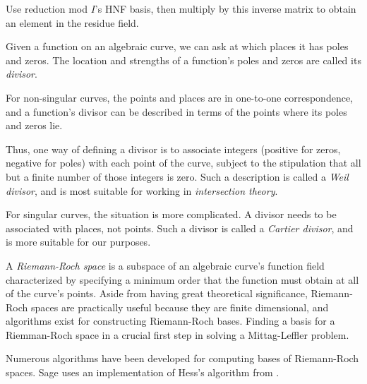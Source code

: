Use reduction mod $I$'s HNF basis, then multiply by this inverse matrix to obtain an element in the residue field.



\vfill\eject
{}

Given a function on an algebraic curve, we can ask at which places it
has poles and zeros.  The location and strengths of a function's
poles and zeros are called its {\it divisor}.

For non-singular curves, the points and places are in one-to-one
correspondence, and a function's divisor can be described in terms
of the points where its poles and zeros lie.

Thus, one way of defining a divisor is to associate integers (positive
for zeros, negative for poles) with each point of the curve, subject
to the stipulation that all but a finite number of those integers is
zero.  Such a description is called a {\it Weil divisor}, and is most
suitable for working in {\it intersection theory}.

For singular curves, the situation is more complicated.  A divisor
needs to be associated with places, not points.  Such a divisor is
called a {\it Cartier divisor}, and is more suitable for our purposes.

\vfill\eject
{}

A {\it Riemann-Roch space} is a subspace of an algebraic curve's
function field characterized by specifying a minimum order that the
function must obtain at all of the curve's points.  Aside from having
great theoretical significance, Riemann-Roch spaces are practically
useful because they are finite dimensional, and algorithms exist for
constructing Riemann-Roch bases.  Finding a basis for a Riemman-Roch
space in a crucial first step in solving a Mittag-Leffler problem.

Numerous algorithms have been developed for computing bases of
Riemann-Roch spaces.  Sage uses an implementation of Hess's algorithm
from \cite{hess}.

